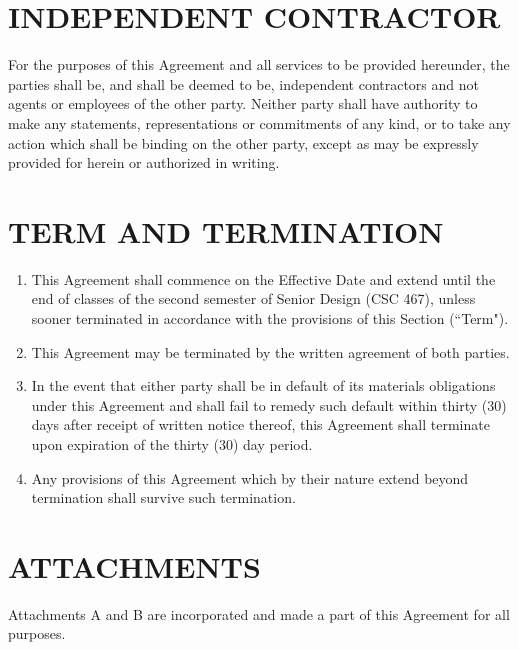 \documentclass[11pt]{article}
\begin{document}
\section{INDEPENDENT CONTRACTOR}  

For the purposes of this Agreement and all services to be provided hereunder, the parties shall be, and shall be deemed to be, independent contractors and not agents or employees of the other party. Neither party shall have authority to make any statements, representations or commitments of any kind, or to take any action which shall be binding on the other party, except as may be expressly provided for herein or authorized in writing.  

\section{TERM AND TERMINATION }    
\begin{enumerate}  \itemsep4pt \parskip0pt 
\item This Agreement shall commence on the Effective Date and extend until the end of classes of the second semester of Senior Design (CSC 467), unless sooner terminated in accordance with the provisions of this Section (``Term"). 

\item This Agreement may be terminated by the written agreement of both       parties.    

\item In the event that either party shall be in default of its       materials obligations under this Agreement and shall fail to       remedy such default within thirty (30) days after receipt of       written notice thereof, this Agreement shall terminate upon       expiration of the thirty (30) day period.    

\item Any provisions of this Agreement which by their nature extend       beyond termination shall survive such termination.  
\end{enumerate}


\section{ATTACHMENTS}  

Attachments A and B are incorporated and made a part of this Agreement for all purposes.  
\end{document}
